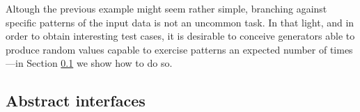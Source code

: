 


Altough the previous example might seem rather simple, branching against
specific patterns of the input data is not an uncommon task.
%
In that light, and in order to obtain interesting test cases, it is desirable to
conceive generators able to produce random values capable to exercise patterns
an expected number of times---in Section \ref{} we show how to do so.



\subsection{Abstract interfaces}

